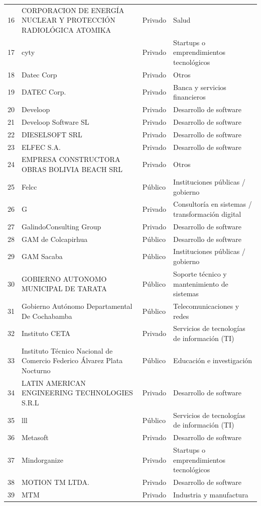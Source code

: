 {\begin{longtable}{rL{6.2cm}lL{4.6cm}}
16 & CORPORACION DE ENERGÍA NUCLEAR Y PROTECCIÓN RADIOLÓGICA ATOMIKA & Privado & Salud \\
17 & cyty & Privado & Startups o emprendimientos tecnológicos \\
18 & Datec Corp & Privado & Otros \\
19 & DATEC Corp. & Privado & Banca y servicios financieros \\
20 & Develoop & Privado & Desarrollo de software \\
21 & Develoop Software SL & Privado & Desarrollo de software \\
22 & DIESELSOFT SRL & Privado & Desarrollo de software \\
23 & ELFEC S.A. & Privado & Desarrollo de software \\
24 & EMPRESA CONSTRUCTORA OBRAS BOLIVIA BEACH SRL & Privado & Otros \\
25 & Felcc & Público & Instituciones públicas / gobierno \\
26 & G & Privado & Consultoría en sistemas / transformación digital \\
27 & GalindoConsulting Group & Privado & Desarrollo de software \\
28 & GAM de Colcapirhua & Público & Desarrollo de software \\
29 & GAM Sacaba & Público & Instituciones públicas / gobierno \\
30 & GOBIERNO AUTONOMO MUNICIPAL DE TARATA & Público & Soporte técnico y mantenimiento de sistemas \\
31 & Gobierno Autónomo Departamental De Cochabamba & Público & Telecomunicaciones y redes \\
32 & Instituto CETA & Privado & Servicios de tecnologías de información (TI) \\
33 & Instituto Técnico Nacional de Comercio Federico Álvarez Plata Nocturno & Público & Educación e investigación \\
34 & LATIN AMERICAN ENGINEERING TECHNOLOGIES S.R.L & Privado & Desarrollo de software \\
35 & lll & Público & Servicios de tecnologías de información (TI) \\
36 & Metasoft & Privado & Desarrollo de software \\
37 & Mindorganize & Privado & Startups o emprendimientos tecnológicos \\
38 & MOTION TM LTDA. & Privado & Desarrollo de software \\
39 & MTM & Privado & Industria y manufactura \\

\end{longtable}}
